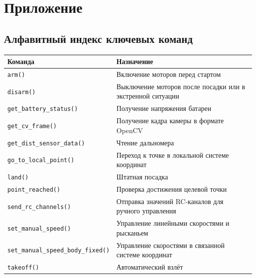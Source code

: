 \section{Приложение}

\subsection{Алфавитный индекс ключевых команд}
\begin{longtable}{>{\raggedright\arraybackslash}p{}>{\raggedright\arraybackslash}p{}}
\toprule
Команда & Назначение \\
\midrule
\texttt{arm()} & Включение моторов перед стартом \\
\texttt{disarm()} & Выключение моторов после посадки или в экстренной ситуации \\
\texttt{get\_battery\_status()} & Получение напряжения батареи \\
\texttt{get\_cv\_frame()} & Получение кадра камеры в формате OpenCV \\
\texttt{get\_dist\_sensor\_data()} & Чтение дальномера \\
\texttt{go\_to\_local\_point()} & Переход к точке в локальной системе координат \\
\texttt{land()} & Штатная посадка \\
\texttt{point\_reached()} & Проверка достижения целевой точки \\
\texttt{send\_rc\_channels()} & Отправка значений RC-каналов для ручного управления \\
\texttt{set\_manual\_speed()} & Управление линейными скоростями и рысканьем \\
\texttt{set\_manual\_speed\_body\_fixed()} & Управление скоростями в связанной системе координат \\
\texttt{takeoff()} & Автоматический взлёт \\
\bottomrule
\end{longtable}

